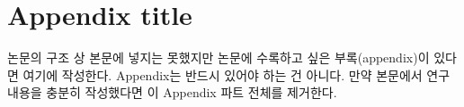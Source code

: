 \documentclass[twoside,11pt]{gshs_thesis}
\begin{document}
\clearpage  %
\appendix
\renewcommand{\thesection}{\Alph{section}} %
\renewcommand{\thesubsection}{\arabic{subsection}}
\renewcommand{\thesubsubsection}{\arabic{subsubsection}}
\renewcommand{\theequation}{\thesection.\arabic{equation}} %
\renewcommand{\thefigure}{\thesection-\arabic{figure}} %
\renewcommand{\thetable}{\thesection-\arabic{table}} %
\setcounter{equation}{0} %
\setcounter{figure}{0} %
\setcounter{table}{0} %
\section{Appendix title}
논문의 구조 상 본문에 넣지는 못했지만 논문에 수록하고 싶은 부록(appendix)이 있다면 여기에 작성한다. Appendix는 반드시 있어야 하는 건 아니다. 만약 본문에서 연구 내용을 충분히 작성했다면 이 Appendix 파트 전체를 제거한다. 
\end{document}
